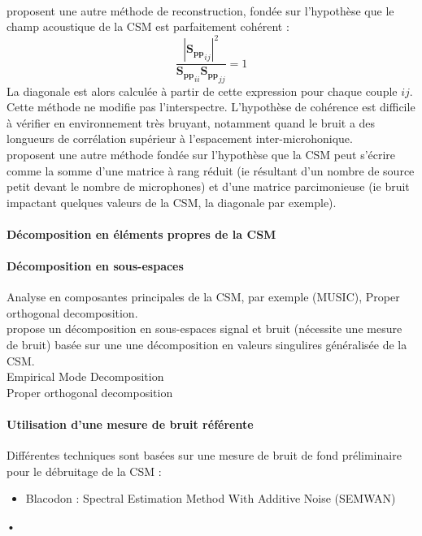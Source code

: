 ~\\
\cite{finez:hal-01276687} proposent une autre méthode de reconstruction, fondée sur l'hypothèse que le champ acoustique de la CSM est parfaitement cohérent : 
\begin{equation}
\frac{|{\bm{S_{pp}}}_{ij}|^2}{{\bm{S_{pp}}}_{ii}{\bm{S_{pp}}}_{jj}} =1
\end{equation}
La diagonale est alors calculée à partir de cette expression pour chaque couple $ij$. Cette méthode ne modifie pas l'interspectre. L'hypothèse de cohérence est difficile à vérifier en environnement très bruyant, notamment quand le bruit a des longueurs de corrélation supérieur à l'espacement inter-microhonique.\\


\cite{finez:hal-01276687} proposent une autre méthode fondée sur l'hypothèse que la CSM peut s'écrire comme la somme d'une matrice à rang réduit (ie résultant d'un nombre de source petit devant le nombre de microphones) et d'une matrice parcimonieuse (ie bruit impactant quelques valeurs de la CSM, la diagonale par exemple).

\paragraph{Décomposition en éléments propres de la CSM}

\paragraph{Décomposition en sous-espaces}
Analyse en composantes principales de la CSM, par exemple (MUSIC), Proper orthogonal decomposition.\\
\cite{Bulte2007} propose un décomposition en sous-espaces signal et bruit (nécessite une mesure de bruit) basée sur une une décomposition en valeurs singulires généralisée de la CSM.\\
Empirical Mode Decomposition\\
Proper orthogonal decomposition

\paragraph{Utilisation d'une mesure de bruit référente}
Différentes techniques sont basées sur une mesure de bruit de fond préliminaire pour le débruitage de la CSM : 
\begin{itemize}
\item Blacodon : Spectral Estimation Method With Additive Noise (SEMWAN)


\end{itemize}•


